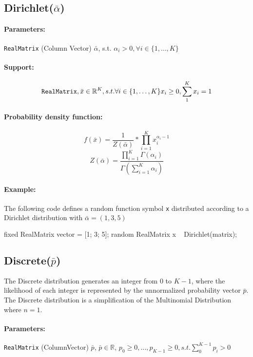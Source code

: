 \subsection{Dirichlet($\bar{\alpha}$)}

\paragraph*{Parameters:} 
\begin{itemize*}
\item[] \verb|RealMatrix| (Column Vector) $\bar{\alpha}$, s.t. $\alpha_{i} > 0, \forall i \in \{1, \ldots, K\}$ 
\end{itemize*}

\paragraph*{Support:} 
\[
\verb|RealMatrix|, \bar{x} \in \mathbb{R}^{K}, s.t. \forall i \in \{1, \ldots, K\} x_{i} \geq 0, \sum_{1}^{K} x_{i} = 1 
\]

\paragraph*{Probability density function:}
\[
	f(\bar{x}) = \frac{1}{Z(\bar{\alpha})} * \prod_{i=1}^{K} x_{i}^{\alpha_{i} - 1}
\]
\[ Z(\bar{\alpha}) = \frac{ \prod_{i=1}^{K} \Gamma(\alpha_{i})   }{ \Gamma(\sum_{i=1}^{K} \alpha_{i} )  } 
\]

\paragraph*{Example:}
The following code defines a random function symbol \verb|x| distributed according to a Dirichlet distribution with $\bar{\alpha} = (1, 3, 5) $
\begin{blogcode}
fixed RealMatrix vector = [1; 3; 5];
random RealMatrix x ~ Dirichlet(matrix);
\end{blogcode}

\subsection{Discrete($\bar{p}$)}
The Discrete distribution generates an integer from $0$ to $K-1$, where the likelihood of each integer is represented by the unnormalized probability vector $\bar{p}$. The Discrete distribution is a simplification of the Multinomial Distribution where $n=1$.

\paragraph*{Parameters:}
\begin{itemize*}
\item[] \verb|RealMatrix| (ColumnVector) $\bar{p}$, $\bar{p} \in \mathbb{R}$, $p_{0} \geq 0, \ldots, p_{K-1} \geq 0, s.t. \sum_{0}^{K-1} p_{i} > 0$
\end{itemize*}

